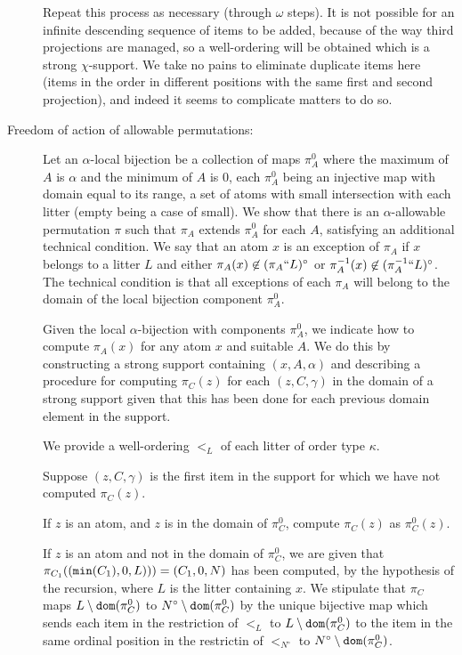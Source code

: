 \documentclass[12pt]{article}
\begin{document}
\begin{description}
  Repeat this process as necessary (through $\omega$ steps).  It is not possible for an infinite descending sequence of items to be added, because of the way third projections are managed, so a well-ordering will be obtained which is a strong $\chi$-support.   We take no pains to eliminate duplicate items here (items in the order in different positions with the same first and second projection), and indeed it seems to complicate matters to do so.

\item[Freedom of action of allowable permutations:]  Let an $\alpha$-local bijection be a collection of maps $\pi^0_A$ where the maximum of $A$ is $\alpha$ and the minimum of $A$ is 0,
each $\pi^0_A$  being an injective map with domain equal to its range, a set of atoms with small intersection with each litter (empty being a case of small).  We show that there is an $\alpha$-allowable permutation
$\pi$ such that $\pi_A$ extends $\pi^0_A$ for each $A$, satisfying an additional technical condition.  We say that an atom $x$ is an exception of $\pi_A$ if $x$ belongs to a litter $L$ and either $\pi_A(x) \not\in (\pi_A``L)^\circ$ or $\pi_A^{-1}(x) \not\in (\pi_A^{-1}``L)^\circ$.  The technical condition is that all exceptions of each $\pi_A$ will belong to the domain of the local bijection component $\pi^0_A$.

Given the local $\alpha$-bijection with components $\pi^0_A$, we indicate how to compute $\pi_A(x)$ for any atom $x$ and suitable $A$.  We do this by constructing a strong support
containing $(x,A,\alpha)$ and describing a procedure for computing $\pi_C(z)$ for each $(z,C,\gamma)$ in the domain of a strong support given that this has been done for each previous domain element in the support.

We provide a well-ordering $<_L$ of each litter of order type $\kappa$.

Suppose $(z,C,\gamma)$ is the first item in the support for which we have not computed $\pi_C(z)$.  

If $z$ is an atom, and $z$ is in the domain of $\pi^0_C$, compute $\pi_C(z)$ as
$\pi^0_C(z)$.

If $z$ is an atom and not in the domain of $\pi^0_C$, we are given that $\pi_{C_1}(({\tt min}(C_1),0,L)))=(C_1,0,N)$ has been computed, by the hypothesis of the recursion, where $L$ is the litter containing $x$.  We stipulate
that $\pi_C$ maps $L \setminus {\tt dom}(\pi^0_C)$ to $N^\circ \setminus {\tt dom}(\pi^0_C)$ by the unique bijective map which sends each item in the restriction of $<_L$ to  $L \setminus {\tt dom}(\pi^0_C)$ to the item in the same ordinal position in the restrictin of $<_{N^\circ}$ to $N^\circ \setminus {\tt dom}(\pi^0_C)$.


\end{description}
\end{document}
